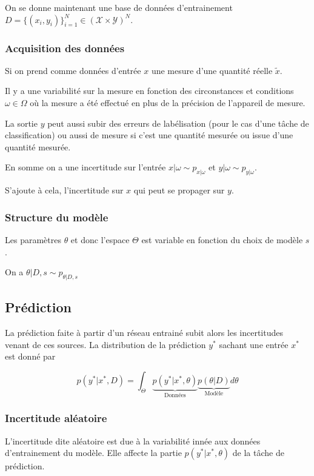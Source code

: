 \documentclass[french,12pt]{article}
\begin{document}
On se donne maintenant une base de données d'entrainement
$D = \{ (x_i, y_i)\}_{i = 1}^N \in (\mathcal{X} \times \mathcal{Y})^N$.

\subsubsection{Acquisition des données}

Si on prend comme données d'entrée $x$ une mesure d'une quantité réelle $\tilde{x}$.

Il y a une variabilité sur la mesure en fonction des circonstances
et conditions $\omega \in \Omega$ où la mesure a été effectué en
plus de la précision de l'appareil de mesure.

La sortie $y$ peut aussi subir des erreurs de labélisation
(pour le cas d'une tâche de classification) ou aussi de mesure si c'est
une quantité mesurée ou issue d'une quantité mesurée.

En somme on a une incertitude sur l'entrée $x | \omega \sim p_{x | \omega}$
et $y | \omega \sim p_{y | \omega}$.

S'ajoute à cela, l'incertitude sur $x$ qui peut se propager sur $y$.

\subsubsection{Structure du modèle}

Les paramètres $\theta$ et donc l'espace $\Theta$ est variable en fonction du choix de modèle $s$.

On a $\theta | D,s \sim p_{\theta | D, s}$

\subsection{Prédiction}

La prédiction faite à partir d'un réseau entrainé subit alors les incertitudes venant
de ces sources. La distribution de la prédiction $y^*$ sachant une entrée $x^*$ est donné par

$$ p(y^* | x^*, D) = \int_{\Theta} \underbrace{p(y^* | x^*, \theta)}_{\text{Données}} \underbrace{p(\theta  | D)}_{\text{Modèle}} d \theta$$

\subsubsection{Incertitude aléatoire}

L'incertitude dite aléatoire est due à la variabilité innée aux données d'entrainement
du modèle. Elle affecte la partie $p(y^* | x^*, \theta)$ de la tâche de prédiction.
\end{document}
